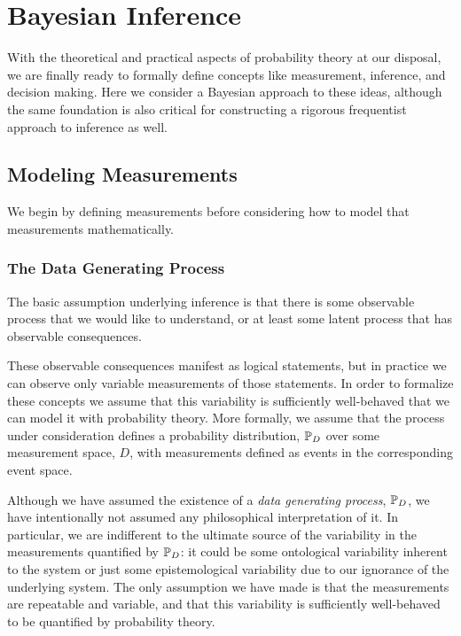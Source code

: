 \chapter{Bayesian Inference}

With the theoretical and practical aspects of probability
theory at our disposal, we are finally ready to formally define 
concepts like measurement, inference, and decision making.  
Here we consider a Bayesian approach to these ideas, although
the same foundation is also critical for constructing a rigorous
frequentist approach to inference as well.

\section{Modeling Measurements}

We begin by defining measurements before considering how
to model that measurements mathematically.

\subsection{The Data Generating Process}

The basic assumption underlying inference is that there is some
observable process that we would like to understand, or at least
some latent process that has observable consequences.

These observable consequences manifest as logical statements,
but in practice we can observe only variable measurements
of those statements.  In order to formalize these concepts we
assume that this variability is sufficiently well-behaved that we
can model it with probability theory.  More formally, we assume
that the process under consideration defines a probability 
distribution, $\mathbb{P}_{D}$ over some measurement space, $D$, 
with measurements defined as events in the corresponding
event space.  

Although we have assumed the existence of a \emph{data
generating process}, $\mathbb{P}_{D}$, we have intentionally not
assumed any philosophical interpretation of it.  In particular, we
are indifferent to the ultimate source of the variability in the
measurements quantified by $\mathbb{P}_{D}$: it could be some
ontological variability inherent to the system or just some
epistemological variability due to our ignorance of the underlying 
system.  The only assumption we have made is that the
measurements are repeatable and variable, and that this
variability is sufficiently well-behaved to be quantified by
probability theory. 

